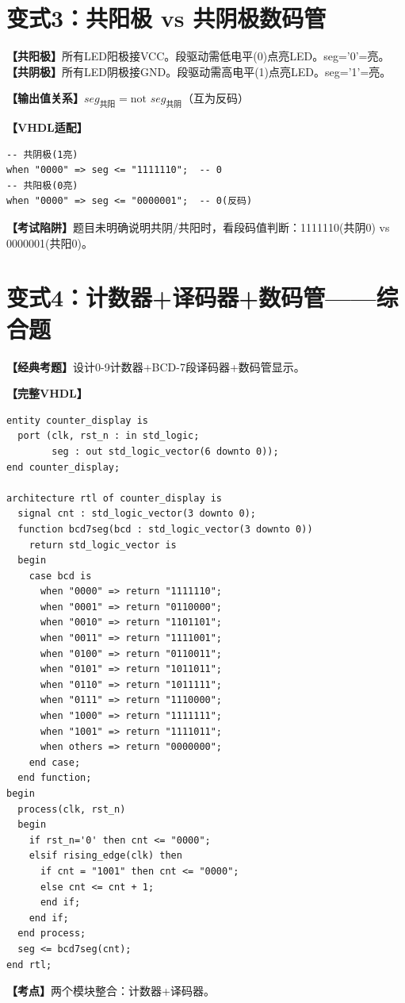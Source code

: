 \section{变式3：共阳极 vs 共阴极数码管}

\begin{detailbox}[完整教学]
\textbf{【共阳极】}所有LED阳极接VCC。段驱动需低电平(0)点亮LED。seg='0'=亮。
\textbf{【共阴极】}所有LED阴极接GND。段驱动需高电平(1)点亮LED。seg='1'=亮。

\textbf{【输出值关系】}$seg_{\text{共阳}} = \text{not } seg_{\text{共阴}}$（互为反码）

\textbf{【VHDL适配】}
\begin{lstlisting}
-- 共阴极(1亮)
when "0000" => seg <= "1111110";  -- 0
-- 共阳极(0亮)
when "0000" => seg <= "0000001";  -- 0(反码)
\end{lstlisting}

\textbf{【考试陷阱】}题目未明确说明共阴/共阳时，看段码值判断：1111110(共阴0) vs 0000001(共阳0)。
\end{detailbox}


\section{变式4：计数器+译码器+数码管——综合题}

\begin{detailbox}[完整教学]
\textbf{【经典考题】}设计0-9计数器+BCD-7段译码器+数码管显示。

\textbf{【完整VHDL】}
\begin{lstlisting}
entity counter_display is
  port (clk, rst_n : in std_logic;
        seg : out std_logic_vector(6 downto 0));
end counter_display;

architecture rtl of counter_display is
  signal cnt : std_logic_vector(3 downto 0);
  function bcd7seg(bcd : std_logic_vector(3 downto 0))
    return std_logic_vector is
  begin
    case bcd is
      when "0000" => return "1111110";
      when "0001" => return "0110000";
      when "0010" => return "1101101";
      when "0011" => return "1111001";
      when "0100" => return "0110011";
      when "0101" => return "1011011";
      when "0110" => return "1011111";
      when "0111" => return "1110000";
      when "1000" => return "1111111";
      when "1001" => return "1111011";
      when others => return "0000000";
    end case;
  end function;
begin
  process(clk, rst_n)
  begin
    if rst_n='0' then cnt <= "0000";
    elsif rising_edge(clk) then
      if cnt = "1001" then cnt <= "0000";
      else cnt <= cnt + 1;
      end if;
    end if;
  end process;
  seg <= bcd7seg(cnt);
end rtl;
\end{lstlisting}

\textbf{【考点】}两个模块整合：计数器+译码器。
\end{detailbox}



